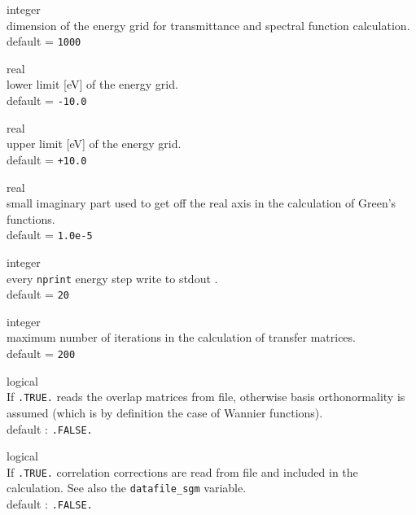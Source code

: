 {\noindent{}%
{\sc integer} \\ dimension of the energy grid for transmittance and spectral function
            calculation.\\
{\sc default} = {\tt 1000}\par

\noindent{}%
{\sc real} \\ lower limit [eV] of the energy grid. \\
{\sc default} = {\tt -10.0} \par

\noindent{}%
{\sc real} \\ upper limit [eV] of the energy grid. \\
{\sc default} = {\tt +10.0} \par

\noindent{}%
{\sc real} \\ small imaginary part used to get off the real axis in the calculation
            of Green's functions. \\
{\sc default} = {\tt 1.0e-5} \par

\noindent{}%
{\sc integer} \\ every {\tt nprint} energy step write to stdout .\\
{\sc default} = {\tt 20} \par

\noindent{}%
{\sc integer} \\ maximum number of iterations in the calculation of transfer
                 matrices. \\
{\sc default} = { \tt 200} \par

\noindent{}%
{\sc logical} \\ If {\tt .TRUE.} reads the overlap matrices from file,
otherwise basis orthonormality
            is assumed (which is by definition the case of Wannier functions). \\
            {\sc default} : {\tt .FALSE.} \par

\noindent{}%
{\sc logical} \\ If {\tt .TRUE.} correlation corrections are read from file and included
            in the calculation. See also the {\tt datafile\_sgm} variable. \\
            {\sc default} : {\tt .FALSE.} \par

}
